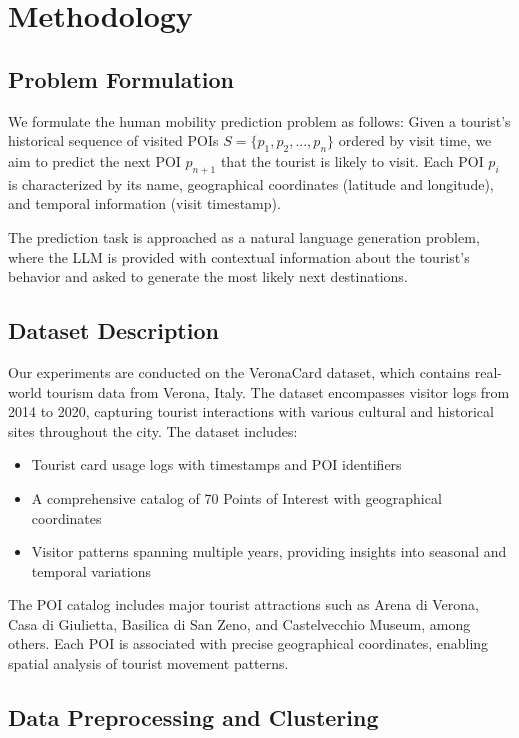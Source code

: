 \documentclass[12pt,a4paper]{article}
\begin{document}
\section{Methodology}

\subsection{Problem Formulation}

We formulate the human mobility prediction problem as follows: Given a tourist's historical sequence of visited POIs $S = \{p_1, p_2, ..., p_n\}$ ordered by visit time, we aim to predict the next POI $p_{n+1}$ that the tourist is likely to visit. Each POI $p_i$ is characterized by its name, geographical coordinates (latitude and longitude), and temporal information (visit timestamp).

The prediction task is approached as a natural language generation problem, where the LLM is provided with contextual information about the tourist's behavior and asked to generate the most likely next destinations.

\subsection{Dataset Description}

Our experiments are conducted on the VeronaCard dataset, which contains real-world tourism data from Verona, Italy. The dataset encompasses visitor logs from 2014 to 2020, capturing tourist interactions with various cultural and historical sites throughout the city. The dataset includes:

\begin{itemize}
\item Tourist card usage logs with timestamps and POI identifiers
\item A comprehensive catalog of 70 Points of Interest with geographical coordinates
\item Visitor patterns spanning multiple years, providing insights into seasonal and temporal variations
\end{itemize}

The POI catalog includes major tourist attractions such as Arena di Verona, Casa di Giulietta, Basilica di San Zeno, and Castelvecchio Museum, among others. Each POI is associated with precise geographical coordinates, enabling spatial analysis of tourist movement patterns.

\subsection{Data Preprocessing and Clustering}
\end{document}
